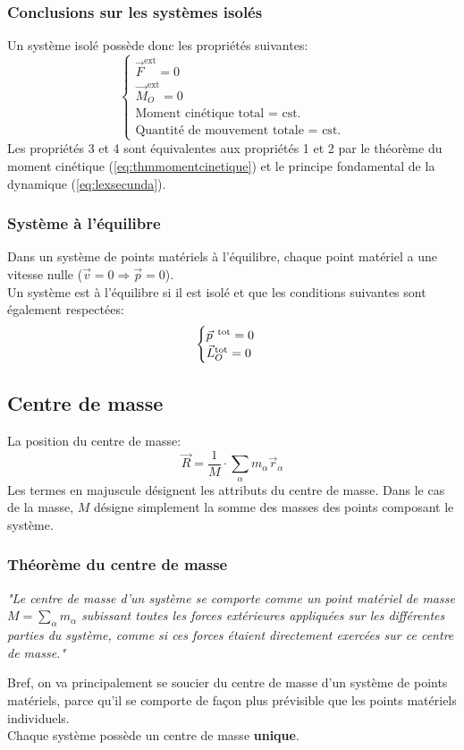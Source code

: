 \documentclass{article}
\numberwithin{equation}{section}
\begin{document}
\subsubsection{Conclusions sur les systèmes isolés}
Un système isolé possède donc les propriétés suivantes:
\begin{equation}
	\begin{cases}
		\vec F^{\text{ext}} = 0 \\
		\vec M_O^{\text{ext}} = 0 \\
		\text{Moment cinétique total = cst.} \\
		\text{Quantité de mouvement totale = cst.}
	\end{cases}
\end{equation}
Les propriétés 3 et 4 sont équivalentes aux propriétés 1 et 2 par le théorème du moment cinétique (\ref{eq:thmmomentcinetique}) et le principe fondamental de la dynamique (\ref{eq:lexsecunda}).

\subsubsection{Système à l'équilibre}
Dans un système de points matériels à l'équilibre, chaque point matériel a une vitesse nulle (\( \vec v = 0 \Rightarrow \vec p = 0  \)). \\
Un système est à l'équilibre si il est isolé et que les conditions suivantes sont également respectées:
\begin{equation}
	\begin{cases}
		\vec p^{\text{\, tot}} = 0 \\
		\vec L_O^{\text{tot}} = 0
	\end{cases}
\end{equation}

\subsection{Centre de masse}
La position du centre de masse:
\begin{equation}
	\boxed{ \vec R = \frac{1}{M} \cdot \sum_\alpha m_\alpha \vec r_\alpha }
\end{equation}
Les termes en majuscule désignent les attributs du centre de masse. Dans le cas de la masse, \(M\) désigne simplement la somme des masses des points composant le système.

\subsubsection{Théorème du centre de masse}
\begin{center}
	\emph{"Le centre de masse d'un système se comporte comme un point matériel de masse \(M = \sum_\alpha m_\alpha\) subissant toutes les forces extérieures appliquées sur les différentes parties du système, comme si ces forces étaient directement exercées sur ce centre de masse."}
\end{center}
Bref, on va principalement se soucier du centre de masse d'un système de points matériels, parce qu'il se comporte de façon plus prévisible que les points matériels individuels. \\
Chaque système possède un centre de masse \textbf{unique}.
\end{document}
